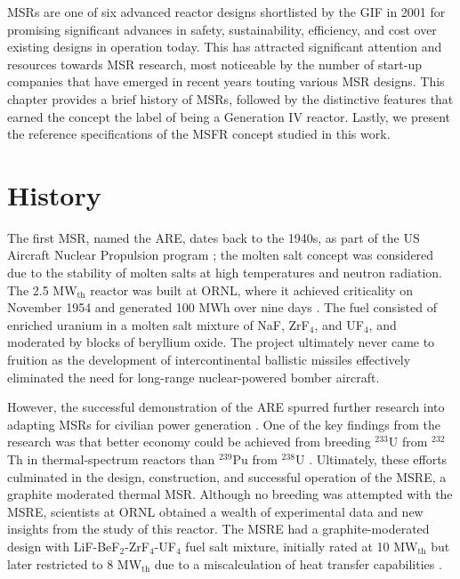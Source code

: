 \glspl{MSR} are one of six advanced reactor designs shortlisted by
the \gls{GIF} in 2001 for promising significant advances in safety,
sustainability, efficiency, and cost over existing designs in operation
today. This has attracted significant attention and resources towards
\gls{MSR} research, most noticeable by the number of start-up companies that
have emerged in recent years touting various \gls{MSR} designs. This chapter
provides a brief history of \glspl{MSR}, followed by the distinctive features
that earned the concept the label of being a Generation IV reactor. Lastly,
we present the reference specifications of the \gls{MSFR} concept studied in
this work.

\section{History}

The first \gls{MSR}, named the \gls{ARE}, dates back to the 1940s,
as part of the US Aircraft Nuclear Propulsion program
\cite{rosenthal_molten-salt_1970}; the molten salt concept was considered due
to the stability of molten salts at high temperatures and neutron radiation.
The 2.5 MW$_{\text{th}}$ reactor was built at \gls{ORNL}, where it achieved
criticality on November 1954 and generated 100 MWh over nine days
\cite{rosenthal_molten-salt_1970}. The fuel
consisted of enriched uranium in a molten salt mixture of NaF, ZrF$_4$, and
UF$_4$, and moderated by blocks of beryllium oxide. The project ultimately
never came to fruition as the development of intercontinental ballistic
missiles effectively eliminated the need for long-range nuclear-powered
bomber aircraft.

However, the successful demonstration of the \gls{ARE} spurred further
research into adapting \glspl{MSR} for civilian power generation
\cite{rosenthal_molten-salt_1970}. One of the key findings from the
research was that better economy could be achieved from breeding $^{233}$U
from $^{232}$Th in thermal-spectrum reactors than $^{239}$Pu from $^{238}$U
\cite{macpherson_molten_1985}. Ultimately, these efforts culminated in the
design, construction, and successful operation of the \gls{MSRE}, a graphite
moderated thermal \gls{MSR}. Although no breeding was attempted with the
\gls{MSRE}, scientists at \gls{ORNL} obtained a wealth of experimental data
and new insights from the study of this reactor. The \gls{MSRE} had a
graphite-moderated design with LiF-BeF$_2$-ZrF$_4$-UF$_4$ fuel salt mixture,
initially rated at 10 MW$_{\text{th}}$ but later restricted to 8
MW$_{\text{th}}$ due to a miscalculation of heat transfer capabilities
\cite{haubenreich_experience_1970}. 

